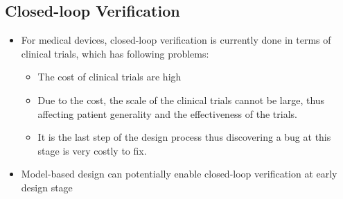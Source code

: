 \documentclass{llncs}
\begin{document}
\subsection{Closed-loop Verification}
\begin{itemize}
    \item For medical devices, closed-loop verification is currently done in terms of clinical trials, which has following problems:
    \begin{itemize}
      \item The cost of clinical trials are high
      \item Due to the cost, the scale of the clinical trials cannot be large, thus affecting patient generality and the effectiveness of the trials.
      \item It is the last step of the design process thus discovering a bug at this stage is very costly to fix.
	\end{itemize}
	\item Model-based design can potentially enable closed-loop verification at early design stage
\end{itemize}
    
\end{document}
